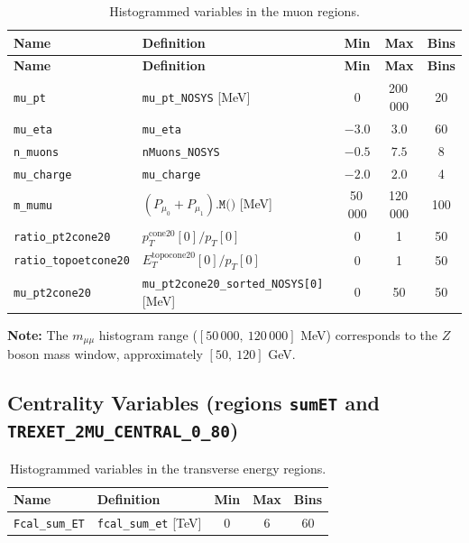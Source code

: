 \documentclass[12pt,a4paper]{article}
\begin{document}
\begin{longtable}{llccc}
\caption{Histogrammed variables in the muon regions.} \\
\toprule
\textbf{Name} & \textbf{Definition} & \textbf{Min} & \textbf{Max} & \textbf{Bins} \\
\midrule
\endfirsthead
\toprule
\textbf{Name} & \textbf{Definition} & \textbf{Min} & \textbf{Max} & \textbf{Bins} \\
\midrule
\endhead
\texttt{mu\_pt}           & \texttt{mu\_pt\_NOSYS} [MeV]                         & 0      & 200\,000 & 20  \\
\texttt{mu\_eta}          & \texttt{mu\_eta}                                      & $-3.0$ & $3.0$    & 60  \\
\texttt{n\_muons}         & \texttt{nMuons\_NOSYS}                                & $-0.5$ & $7.5$    & 8   \\
\texttt{mu\_charge}       & \texttt{mu\_charge}                                   & $-2.0$ & $2.0$    & 4   \\
\texttt{m\_mumu}          & $(P_{\mu_0}+P_{\mu_1}).\texttt{M()}$ [MeV]           & 50\,000 & 120\,000 & 100 \\
\texttt{ratio\_pt2cone20} & $p_T^{\text{cone20}}[0] / p_T[0]$                    & 0      & 1        & 50  \\
\texttt{ratio\_topoetcone20} & $E_T^{\text{topocone20}}[0] / p_T[0]$             & 0      & 1        & 50  \\
\texttt{mu\_pt2cone20}    & \texttt{mu\_pt2cone20\_sorted\_NOSYS[0]} [MeV]        & 0      & 50       & 50  \\
\bottomrule
\end{longtable}

\noindent\textbf{Note:} The $m_{\mu\mu}$ histogram range ($[50\,000,\ 120\,000]$ MeV)
corresponds to the $Z$ boson mass window, approximately $[50,\ 120]$ GeV.

\subsection{Centrality Variables (regions \texttt{sumET} and \texttt{TREXET\_2MU\_CENTRAL\_0\_80})}

\begin{table}[h!]
\centering
\caption{Histogrammed variables in the transverse energy regions.}
\begin{tabular}{llccc}
\toprule
\textbf{Name} & \textbf{Definition} & \textbf{Min} & \textbf{Max} & \textbf{Bins} \\
\midrule
\texttt{Fcal\_sum\_ET} & \texttt{fcal\_sum\_et} [TeV] & 0 & 6 & 60 \\
\bottomrule
\end{tabular}
\end{table}
\end{document}
